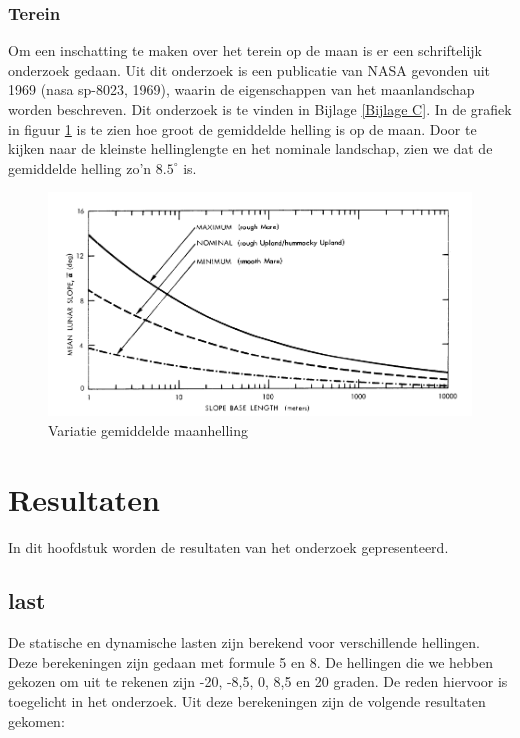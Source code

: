 \documentclass{article}
\begin{document}
            \subsubsection*{Terein}
                Om een inschatting te maken over het terein op de maan is er een schriftelijk onderzoek gedaan.
                Uit dit onderzoek is een publicatie van NASA gevonden uit 1969 (nasa sp-8023, 1969), waarin de eigenschappen van het maanlandschap worden beschreven.
                Dit onderzoek is te vinden in Bijlage \ref{Bijlage C}.
                In de grafiek in figuur \ref{fig:maanhelling} is te zien hoe groot de gemiddelde helling is op de maan.
                Door te kijken naar de kleinste hellinglengte en het nominale landschap, zien we dat de gemiddelde helling zo'n $8.5^\circ$ is.

                \begin{figure}[h]
                    \includegraphics[width=\textwidth]{variation_of_mean_lunar_slope}
                    \caption{Variatie gemiddelde maanhelling}
                    \label{fig:maanhelling}
                    \centering
                \end{figure}
                
    \pagebreak
    \section{Resultaten}
        In dit hoofdstuk worden de resultaten van het onderzoek gepresenteerd.

    \subsection{last}
    De statische en dynamische lasten zijn berekend voor verschillende hellingen. 
    Deze berekeningen zijn gedaan met formule 5 en 8.
    De hellingen die we hebben gekozen om uit te rekenen zijn -20, -8,5, 0, 8,5 en 20 graden.
    De reden hiervoor is toegelicht in het onderzoek.
    Uit deze berekeningen zijn de volgende resultaten gekomen: 
\end{document}
